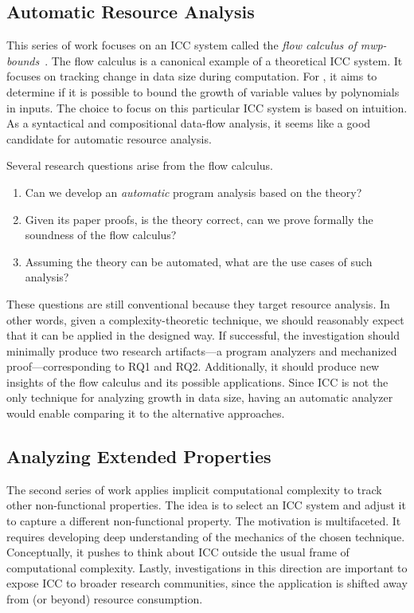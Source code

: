 \subsection{Automatic Resource Analysis}
\label{subsec:aicc-automatic-resource-analysis}

This series of work focuses on an ICC system called the \emph{flow calculus of
mwp-bounds}~\cite{jones2009}. The flow calculus is a
canonical example of a theoretical ICC system. It focuses on tracking change in
data size during computation. For , it aims to
determine if it is possible to bound the growth of variable values by
polynomials in inputs. The choice to focus on this particular ICC system is
based on intuition. As a syntactical and compositional data-flow analysis, it
{seems like} a good candidate for automatic resource analysis.

Several research questions arise from the flow calculus.

\begin{enumerate}[label={(RQ\arabic*)},leftmargin=*,labelindent=1em]
\item Can we develop an \emph{automatic} program analysis based on the theory?
\item Given its paper proofs, is the theory correct, \ie can we prove formally
the soundness of the flow calculus?
\item Assuming the theory can be automated, what are the use cases of such
analysis?
\end{enumerate}

These questions are still conventional because they target resource analysis. In
other words, given a complexity-theoretic technique, we should reasonably expect
that it can be applied in the designed way. If successful, the investigation
should minimally produce two research artifacts---a program analyzers and
mechanized proof---corresponding to RQ1 and RQ2. Additionally, it should produce
new insights of the flow calculus and its possible applications. Since ICC is
not the only technique for analyzing growth in data size, having an automatic
analyzer would enable comparing it to the alternative approaches.

\subsection{Analyzing Extended Properties}
\label{subsec:extended-props}

The second series of work applies implicit computational complexity to track
{other} non-functional properties. The idea is to
select an ICC system and adjust it to capture a different non-functional
property. The motivation is multifaceted. It requires developing deep
understanding of the mechanics of the chosen technique. Conceptually, it pushes
to think about ICC outside the usual frame of computational complexity. Lastly,
investigations in this direction are important to expose ICC to broader research
communities, since the application is shifted away from (or beyond) resource
consumption.

